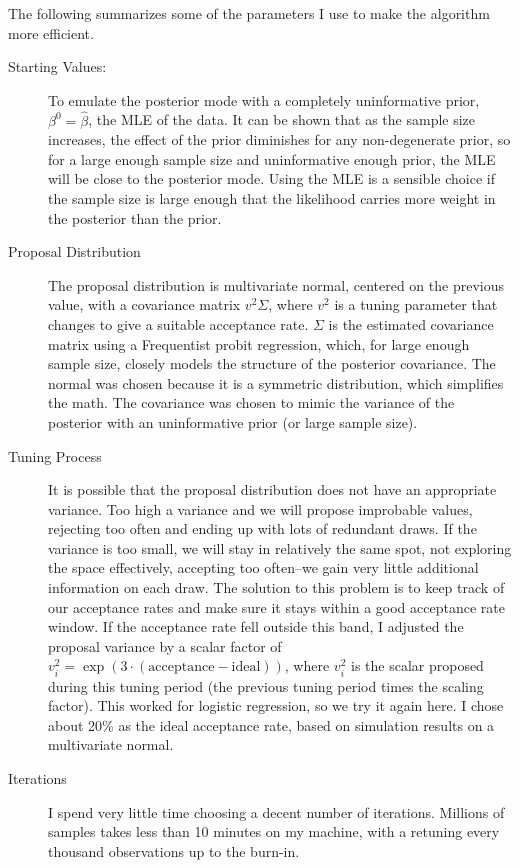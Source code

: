 \documentclass[12pt]{article}
\begin{document}
The following summarizes some of the parameters I use to make the algorithm more efficient.
\begin{description}
\item[Starting Values:] To emulate the posterior mode with a completely uninformative prior, $\beta^0 = \hat{\beta}$, the MLE of the data. It can be shown that as the sample size increases, the effect of the prior diminishes for any non-degenerate prior, so for a large enough sample size and uninformative enough prior, the MLE will be close to the posterior mode. Using the MLE is a sensible choice if the sample size is large enough that the likelihood carries more weight in the posterior than the prior.

\item[Proposal Distribution] The proposal distribution is multivariate normal, centered on the previous value, with a covariance matrix $v^2 \Sigma$, where $v^2$ is a tuning parameter that changes to give a suitable acceptance rate. $\Sigma$ is the estimated covariance matrix using a Frequentist probit regression, which, for large enough sample size, closely models the structure of the posterior covariance. The normal was chosen because it is a symmetric distribution, which simplifies the math. The covariance was chosen to mimic the variance of the posterior with an uninformative prior (or large sample size).

\item[Tuning Process] It is possible that the proposal distribution does not have an appropriate variance. Too high a variance and we will propose improbable values, rejecting too often and ending up with lots of redundant draws. If the variance is too small, we will stay in relatively the same spot, not exploring the space effectively, accepting too often--we gain very little additional information on each draw. The solution to this problem is to keep track of our acceptance rates and make sure it stays within a good acceptance rate window. If the acceptance rate fell outside this band, I adjusted the proposal variance by a scalar factor of $v_i^{2} = \exp{(3 \cdot (\text{acceptance}-\text{ideal}))}$, where $v_i^2$ is the scalar proposed during this tuning period (the previous tuning period times the scaling factor). This worked for logistic regression, so we try it again here. I chose about 20\% as the ideal acceptance rate, based on simulation results on a multivariate normal. 

\item[Iterations] I spend very little time choosing a decent number of iterations. Millions of samples takes less than 10 minutes on my machine, with a retuning every thousand observations up to the burn-in.


\end{description}
\end{document}

